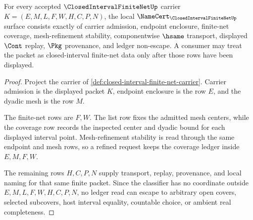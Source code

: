 \begin{theorem}
\label{thm:closed-interval-finite-net-obligation-surface}
For every accepted $\ClosedIntervalFiniteNetUp$ carrier $K=(E,M,L,F,W,H,C,P,N)$, the local $\NameCert_{\ClosedIntervalFiniteNetUp}$ surface consists exactly of carrier admission, endpoint enclosure, finite-net coverage, mesh-refinement stability, componentwise $\hsame$ transport, displayed $\Cont$ replay, $\Pkg$ provenance, and ledger non-escape. A consumer may treat the packet as closed-interval finite-net data only after those rows have been displayed.
\end{theorem}
\begin{proof}
Project the carrier of \autoref{def:closed-interval-finite-net-carrier}. Carrier admission is the displayed packet $K$, endpoint enclosure is the row $E$, and the dyadic mesh is the row $M$.

The finite-net rows are $F,W$. The list row fixes the admitted mesh centers, while the coverage row records the inspected center and dyadic bound for each displayed interval point. Mesh-refinement stability is read through the same endpoint and mesh rows, so a refined request keeps the coverage ledger inside $E,M,F,W$.

The remaining rows $H,C,P,N$ supply transport, replay, provenance, and local naming for that same finite packet. Since the classifier has no coordinate outside $E,M,L,F,W,H,C,P,N$, no ledger read can escape to arbitrary open covers, selected subcovers, host interval equality, countable choice, or ambient real completeness.
\end{proof}

